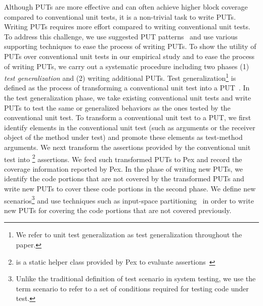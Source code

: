 Although PUTs are more effective and can often achieve higher block coverage
compared to conventional unit tests, it is a non-trivial task to write PUTs.
Writing PUTs requires more effort compared to writing conventional unit tests.
To address this challenge, we use suggested PUT patterns~\cite{halleux08:putpatterns} and use various supporting techniques to ease the process of writing PUTs. 
To show the utility of PUTs over conventional unit tests in our empirical study and to ease the process of writing PUTs, we carry out a systematic procedure including two phases (1) \textit{test generalization} and (2) writing additional PUTs. Test generalization\footnote{We refer to unit test generalization as test generalization throughout the paper.} is defined as the process of transforming a conventional unit test into a PUT~\cite{tillmann06:unit}. In the test generalization phase, we take existing conventional unit tests and write PUTs to test the same or generalized behaviors as the ones tested by the conventional unit test. To transform a conventional unit test to a PUT, we first identify elements in the conventional
unit test (such as arguments or the receiver object  
of the method under test) and promote these elements as test-method arguments.
We next transform the assertions provided by the conventional unit test into
\footnote{ is a static helper class provided by Pex to evaluate assertions~\cite{PEXDOC}} assertions. We feed such transformed PUTs to Pex and record the coverage information reported by Pex. In the phase of writing new PUTs, we identify the code portions that are not covered by the transformed PUTs and write new PUTs to cover these code portions in the second phase. We define new scenarios\footnote{Unlike the traditional definition of test scenario in system testing, we use the term scenario to refer to a set of conditions required for testing code under test.} and use techniques such as input-space partitioning~\cite{paul:offut} in order to write new PUTs for covering the code portions that are not covered previously. 

